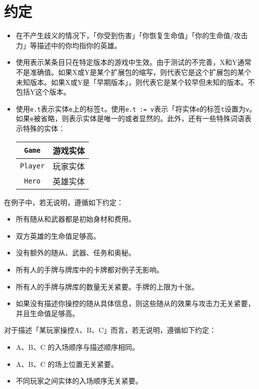 \chapter{约定}

\begin{itemize}
    \item 在不产生歧义的情况下，「你受到伤害」「你恢复生命值」「你的生命值/攻击力」等描述中的你均指你的英雄。
    \item 使用表示某条目只在特定版本的游戏中生效。由于测试的不完善，X和Y通常不是准确值。如果X或Y是某个扩展包的缩写，则代表它是这个扩展包的某个未知版本。如果X或Y是「早期版本」，则代表它是某个较早但未知的版本。不包括Y这个版本。
    \item 使用\texttt{e.t}表示实体\texttt{e}上的标签\texttt{t}。使用\texttt{e.t := v}表示「将实体\texttt{e}的标签\texttt{t}设置为\texttt{v}。如果\texttt{e}被省略，则表示实体是唯一的或者显然的。此外，还有一些特殊词语表示特殊的实体：
        \begin{center}
            \begin{tabular}{|c|c|}
                \hline
                \texttt{Game} & 游戏实体 \\
                \hline
                \texttt{Player} & 玩家实体 \\
                \hline
                \texttt{Hero} & 英雄实体 \\
                \hline
            \end{tabular}
        \end{center}
\end{itemize}

在例子中，若无说明，遵循如下约定：

\begin{itemize}
    \item 所有随从和武器都是初始身材和费用。
    \item 双方英雄的生命值足够高。
    \item 没有额外的随从、武器、任务和奥秘。
    \item 所有人的手牌与牌库中的卡牌都对例子无影响。
    \item 所有人的手牌与牌库的数量无关紧要。手牌的上限为十张。
    \item 如果没有描述你操控的随从具体信息，则这些随从的效果与攻击力无关紧要，并且生命值足够高。
\end{itemize}

对于描述「某玩家操控A、B、C」而言，若无说明，遵循如下约定：

\begin{itemize}
    \item A、B、C 的入场顺序与描述顺序相同。
    \item A、B、C 的场上位置无关紧要。
    \item 不同玩家之间实体的入场顺序无关紧要。
\end{itemize}
